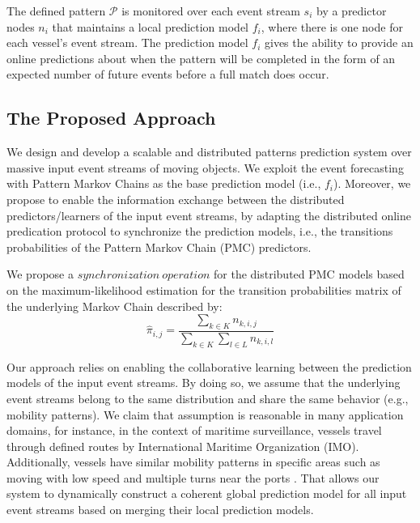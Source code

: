 The defined pattern $\mathcal{P}$ is monitored over each event stream $s_i$  by a  predictor nodes  $n_i$  that maintains a local prediction model $f_i$, where there is one node for each vessel's event stream.  The prediction model $f_i$ gives the ability to provide an online predictions about when the pattern will be completed in the form of an expected number of future events before a full match does occur.

\subsection{The Proposed Approach}
\label{sec:proposed_approach}
\par We design and develop a scalable and distributed patterns prediction system over massive input event streams of moving objects. We  exploit the event forecasting with Pattern Markov Chains \cite{alevizos2017event} as the base prediction model (i.e., $f_i$). Moreover,  we propose to enable the information exchange between the distributed predictors/learners of the input event streams, by adapting the distributed online predication protocol \cite{kamp2014communication} to synchronize the prediction models, i.e., the transitions probabilities of the Pattern Markov Chain (PMC) predictors.

\par We propose a $synchronization\ operation$  for the distributed PMC models based on the maximum-likelihood estimation \citep{anderson1957statistical} for the transition probabilities matrix of the underlying Markov Chain described by: 
\begin{equation*}
\label{eq:dis_pi_estim}
\hat{\pi}_{i,j}=\frac{\sum_{k \in K} n_{k,i,j}}{\sum_{k \in K} \sum_{l \in L} n_{k,i,l}}
\end{equation*}


\par Our approach relies on enabling the collaborative learning between the prediction models of  the input event streams. By doing so, we assume that the underlying event streams belong to the same  distribution and share the same behavior (e.g., mobility patterns). We claim that assumption is reasonable in many application domains, for instance, in the context of maritime surveillance, vessels travel through defined routes by International Maritime Organization (IMO). Additionally, vessels have similar mobility patterns in specific areas such as moving with low speed and multiple turns near the ports \cite{pallotta2013vessel,liu2014knowledge}. That allows our system to dynamically construct a coherent global prediction model for all input event streams based on merging their local prediction models.

